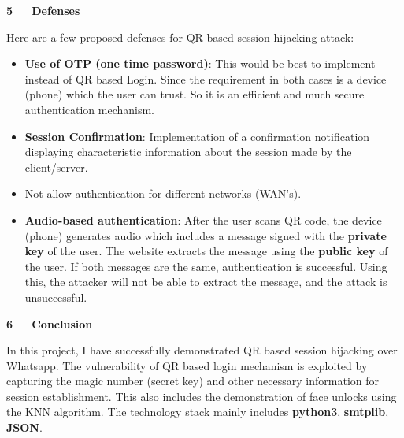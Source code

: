 \documentclass[12pt]{report}
\renewcommand{\_}{\kern-1.5pt\textunderscore\kern-1.5pt}
\begin{document}
\vspace{\baselineskip}
\begin{FlushLeft}
{\fontsize{18pt}{21.6pt}\selectfont \textbf{5\ \ \  Defenses}\par}
\end{FlushLeft}\par

\begin{FlushLeft}
Here are a few proposed defenses for QR based session hijacking attack:
\end{FlushLeft}\par

\begin{itemize}
	\item \textbf{Use of OTP (one time password)}: This would be best to implement instead of QR based Login. Since the requirement in both cases is a device (phone) which the user can trust. So it is an efficient and much secure authentication mechanism.\par

	\item \textbf{Session Confirmation}: Implementation of a confirmation notification displaying characteristic information about the session made by the client/server.\par

	\item Not allow authentication for different networks (WAN’s).\par

	\item \textbf{Audio-based authentication}: After the user scans QR code, the device (phone) generates audio which includes a message signed with the \textbf{private key} of the user. The website extracts the message using the \textbf{public key} of the user. If both messages are the same, authentication is successful. Using this, the attacker will not be able to extract the message, and the attack is unsuccessful.
\end{itemize}\par

\begin{FlushLeft}
{\fontsize{18pt}{21.6pt}\selectfont \textbf{6\ \ \  Conclusion}\par}
\end{FlushLeft}\par

\begin{FlushLeft}
In this project, I have successfully demonstrated QR based session hijacking over Whatsapp. The vulnerability of QR based login mechanism is exploited by capturing the magic number (secret key) and other necessary information for session establishment. This also includes the demonstration of face unlocks using the KNN algorithm. The technology stack mainly includes \textbf{python3}, \textbf{smtplib}, \textbf{JSON}.
\end{FlushLeft}\par
\end{document}
